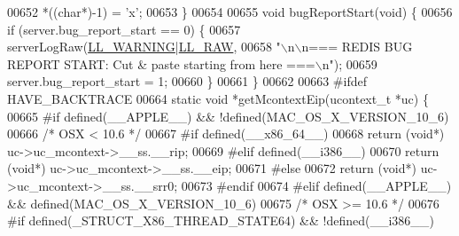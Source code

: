 \begin{DoxyCode}
{{{{{{{{{{{{{{{{{{{{{{{{{{{{{{{{{{{{{{{{{{00652     *((\textcolor{keywordtype}{char}*)-1) = \textcolor{stringliteral}{'x'};
00653 \}
00654 
00655 \textcolor{keywordtype}{void} bugReportStart(\textcolor{keywordtype}{void}) \{
00656     \textcolor{keywordflow}{if} (server.bug\_report\_start == 0) \{
00657         serverLogRaw(\hyperlink{server_8h_a31229b9334bba7d6be2a72970967a14b}{LL\_WARNING}|\hyperlink{server_8h_a6b3768a4d2dfb3ac580b8d999baa9350}{LL\_RAW},
00658         \textcolor{stringliteral}{"\(\backslash\)n\(\backslash\)n=== REDIS BUG REPORT START: Cut & paste starting from here ===\(\backslash\)n"});
00659         server.bug\_report\_start = 1;
00660     \}
00661 \}
00662 
00663 \textcolor{preprocessor}{#}\textcolor{preprocessor}{ifdef} HAVE\_BACKTRACE
00664 \textcolor{keyword}{static} \textcolor{keywordtype}{void} *getMcontextEip(ucontext\_t *uc) \{
00665 \textcolor{preprocessor}{#}\textcolor{preprocessor}{if} \textcolor{preprocessor}{defined}\textcolor{preprocessor}{(}\textcolor{preprocessor}{\_\_APPLE\_\_}\textcolor{preprocessor}{)} \textcolor{preprocessor}{&&} \textcolor{preprocessor}{!}\textcolor{preprocessor}{defined}\textcolor{preprocessor}{(}\textcolor{preprocessor}{MAC\_OS\_X\_VERSION\_10\_6}\textcolor{preprocessor}{)}
00666     \textcolor{comment}{/* OSX < 10.6 */}
00667     \textcolor{preprocessor}{#}\textcolor{preprocessor}{if} \textcolor{preprocessor}{defined}\textcolor{preprocessor}{(}\textcolor{preprocessor}{\_\_x86\_64\_\_}\textcolor{preprocessor}{)}
00668     \textcolor{keywordflow}{return} (\textcolor{keywordtype}{void}*) uc->uc\_mcontext->\_\_ss.\_\_rip;
00669     \textcolor{preprocessor}{#}\textcolor{preprocessor}{elif} \textcolor{preprocessor}{defined}\textcolor{preprocessor}{(}\textcolor{preprocessor}{\_\_i386\_\_}\textcolor{preprocessor}{)}
00670     \textcolor{keywordflow}{return} (\textcolor{keywordtype}{void}*) uc->uc\_mcontext->\_\_ss.\_\_eip;
00671     \textcolor{preprocessor}{#}\textcolor{preprocessor}{else}
00672     \textcolor{keywordflow}{return} (\textcolor{keywordtype}{void}*) uc->uc\_mcontext->\_\_ss.\_\_srr0;
00673     \textcolor{preprocessor}{#}\textcolor{preprocessor}{endif}
00674 \textcolor{preprocessor}{#}\textcolor{preprocessor}{elif} \textcolor{preprocessor}{defined}\textcolor{preprocessor}{(}\textcolor{preprocessor}{\_\_APPLE\_\_}\textcolor{preprocessor}{)} \textcolor{preprocessor}{&&} \textcolor{preprocessor}{defined}\textcolor{preprocessor}{(}\textcolor{preprocessor}{MAC\_OS\_X\_VERSION\_10\_6}\textcolor{preprocessor}{)}
00675     \textcolor{comment}{/* OSX >= 10.6 */}
00676     \textcolor{preprocessor}{#}\textcolor{preprocessor}{if} \textcolor{preprocessor}{defined}\textcolor{preprocessor}{(}\textcolor{preprocessor}{\_STRUCT\_X86\_THREAD\_STATE64}\textcolor{preprocessor}{)} \textcolor{preprocessor}{&&} \textcolor{preprocessor}{!}\textcolor{preprocessor}{defined}\textcolor{preprocessor}{(}\textcolor{preprocessor}{\_\_i386\_\_}\textcolor{preprocessor}{)}
}}}}}}}}}}}}}}}}}}}}}}}}}}}}}}}}}}}}}}}}}}
\end{DoxyCode}

